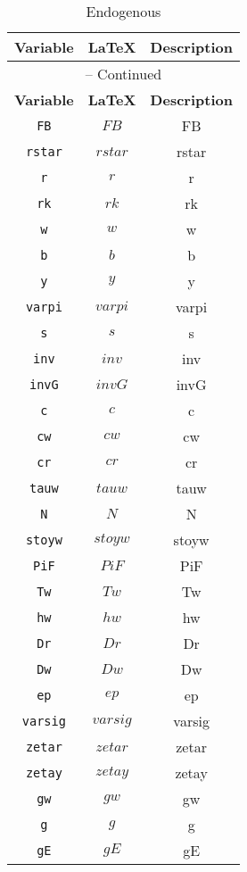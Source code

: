 \begin{center}
\begin{longtable}{ccc}
\caption{Endogenous}\\%
\hline%
\multicolumn{1}{c}{\textbf{Variable}} &
\multicolumn{1}{c}{\textbf{\LaTeX}} &
\multicolumn{1}{c}{\textbf{Description}}\\%
\hline\hline%
\endfirsthead
\multicolumn{3}{c}{{\tablename} \thetable{} -- Continued}\\%
\hline%
\multicolumn{1}{c}{\textbf{Variable}} &
\multicolumn{1}{c}{\textbf{\LaTeX}} &
\multicolumn{1}{c}{\textbf{Description}}\\%
\hline\hline%
\endhead
\texttt{FB} & $FB$ & FB\\
\texttt{rstar} & $rstar$ & rstar\\
\texttt{r} & $r$ & r\\
\texttt{rk} & $rk$ & rk\\
\texttt{w} & $w$ & w\\
\texttt{b} & $b$ & b\\
\texttt{y} & $y$ & y\\
\texttt{varpi} & $varpi$ & varpi\\
\texttt{s} & $s$ & s\\
\texttt{inv} & $inv$ & inv\\
\texttt{invG} & $invG$ & invG\\
\texttt{c} & $c$ & c\\
\texttt{cw} & $cw$ & cw\\
\texttt{cr} & $cr$ & cr\\
\texttt{tauw} & $tauw$ & tauw\\
\texttt{N} & $N$ & N\\
\texttt{stoyw} & $stoyw$ & stoyw\\
\texttt{PiF} & $PiF$ & PiF\\
\texttt{Tw} & $Tw$ & Tw\\
\texttt{hw} & $hw$ & hw\\
\texttt{Dr} & $Dr$ & Dr\\
\texttt{Dw} & $Dw$ & Dw\\
\texttt{ep} & $ep$ & ep\\
\texttt{varsig} & $varsig$ & varsig\\
\texttt{zetar} & $zetar$ & zetar\\
\texttt{zetay} & $zetay$ & zetay\\
\texttt{gw} & $gw$ & gw\\
\texttt{g} & $g$ & g\\
\texttt{gE} & $gE$ & gE\\

\end{longtable}
\end{center}
